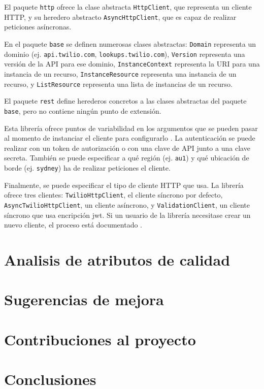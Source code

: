 \documentclass{article}
\begin{document}
El paquete \verb|http| ofrece la clase abstracta
\verb|HttpClient|, que representa un cliente HTTP,
y su heredero abstracto \verb|AsyncHttpClient|,
que es capaz de realizar peticiones asíncronas.

En el paquete \verb|base| se definen numerosas clases abstractas:
\verb|Domain| representa un dominio
(ej. \verb|api.twilio.com|, \verb|lookups.twilio.com|),
\verb|Version| representa una versión de la API para ese dominio,
\verb|InstanceContext| representa la URI para una instancia de un recurso,
\verb|InstanceResource| representa una instancia de un recurso,
y \verb|ListResource| representa una lista de instancias de un recurso.

El paquete \verb|rest| define herederos concretos a las clases abstractas
del paquete \verb|base|, pero no contiene ningún punto de extensión.

\hfill

Esta librería ofrece puntos de variabilidad
en los argumentos que se pueden pasar
al momento de instanciar el cliente para configurarlo
\cite{readme}.
La autenticación se puede realizar con un token de autorización o
con una clave de API junto a una clave secreta.
También se puede especificar a qué región (ej. \verb|au1|)
y qué ubicación de borde (ej. \verb|sydney|)
ha de realizar peticiones el cliente.

Finalmente, se puede especificar el tipo de cliente HTTP que usa.
La librería ofrece tres clientes:
\verb|TwilioHttpClient|, el cliente síncrono por defecto,
\verb|AsyncTwilioHttpClient|, un cliente asíncrono, y
\verb|ValidationClient|, un cliente síncrono que usa encripción jwt.
Si un usuario de la librería necesitase crear un nuevo cliente,
el proceso está documentado
\cite{crear-cliente-http}.

\section{Analisis de atributos de calidad}

\section{Sugerencias de mejora}

\section{Contribuciones al proyecto}

\section{Conclusiones}

\printbibliography
\end{document}
